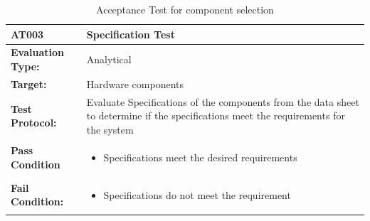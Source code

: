 \begin{table}[H]
    \label{tab:AT002}
\end{table}

\begin{table}[H]
    \centering
    \caption{Acceptance Test for component selection}
    \begin{tabular}{|m{}|m{}|}
    \hline
   \textbf{AT003 }& \textbf{Specification Test} \\
     \hline
    \textbf{Evaluation Type:} & Analytical \\
     \hline
    \textbf{Target: } & Hardware components\\
    \hline
    \textbf{Test Protocol:} & Evaluate Specifications of the components from the data sheet to determine if the specifications meet the requirements for the system \\
    \hline
    \textbf{Pass Condition} & \vspace{5pt} \begin{itemize}
        \item Specifications meet the desired requirements
    \end{itemize} \\
    \hline
    \textbf{Fail Condition:} & \vspace{5pt} \begin{itemize}
        \item Specifications do not meet the requirement
        \end{itemize}\\
        \hline
    \end{tabular}

    \label{tab:AT003}
\end{table}

